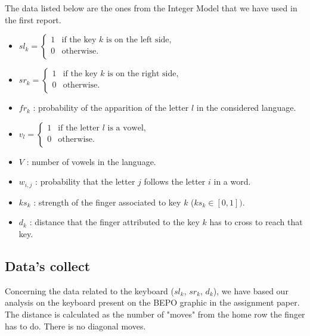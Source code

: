 \documentclass[a4paper,titlepage]{article}
\begin{document}
The data listed below are the ones from the Integer Model that we have used in the first report.
\begin{itemize}		
	\item $sl_{k} = \left\{ 
	\begin{array}{ll}
		1 & \text{if the key $k$ is on the left side,}\\
		0 & \text{otherwise.}\\
	\end{array}
	\right.$

	\item $sr_{k} = \left\{ 
	\begin{array}{ll}
		1 & \text{if the key $k$ is on the right side,}\\
		0 & \text{otherwise.}\\
	\end{array}
	\right.$

	\item $fr_k$ : probability of the apparition of the letter $l$ in the considered language.

	\item $v_{l} = \left\{ 
	\begin{array}{ll}
		1 & \text{if the letter $l$ is a vowel,}\\
		0 & \text{otherwise.}\\
	\end{array}
	\right.$

	\item $V$ : number of vowels in the language.

	\item $w_{i,j}$ : probability that the letter $j$ follows the letter $i$ in a word. 

	\item $ks_{k}$ : strength of the finger associated to key $k$ ($ks_k \in [0,1])$.

	\item $d_k$ : distance that the finger attributed to the key $k$ has to cross to reach that key.
\end{itemize}

	\subsection{Data's collect}

Concerning the data related to the keyboard ($sl_{k}$, $sr_{k}$, $d_{k}$), we have based our analysis on the keyboard present on the BEPO graphic in the assignment paper. The distance is calculated as the number of "moves" from the home row the finger has to do. There is no diagonal moves. 
\end{document}
